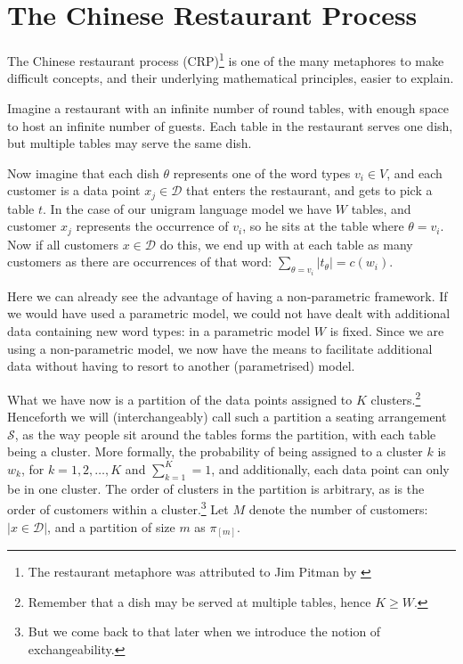 \section{The Chinese Restaurant Process}
The Chinese restaurant process (CRP)\footnote{The restaurant metaphore was attributed to Jim Pitman by \cite{Aldous1985Exchangeability}} is one of the many metaphores to make difficult concepts, and their underlying mathematical principles, easier to explain. 

Imagine a restaurant with an infinite number of round tables, with enough space to host an infinite number of guests. Each table in the restaurant serves one dish, but multiple tables may serve the same dish.

Now imagine that each dish $\theta$ represents one of the word types $v_i \in V$, and each customer is a data point $x_j\in\mathcal{D}$ that enters the restaurant, and gets to pick a table $t$. In the case of our unigram language model we have $W$ tables, and customer $x_j$ represents the occurrence of $v_i$, so he sits at the table where $\theta = 
v_i$. Now if all customers $x\in\mathcal{D}$ do this, we end up with at each table as many customers as there are occurrences of that word: $\sum_{\theta=v_i}|t_{\theta}| = c(w_i)$.

Here we can already see the advantage of having a non-parametric framework. If we would have used a parametric model, we could not have dealt with additional data containing new word types: in a parametric model $W$ is fixed. Since we are using a non-parametric model, we now have the means to facilitate additional data without having to resort to another (parametrised) model.

What we have now is a partition of the data points assigned to $K$ clusters.\footnote{Remember that a dish may be served at multiple tables, hence $K\geq W$.} Henceforth we will (interchangeably) call such a partition a seating arrangement $\mathcal{S}$, as the way people sit around the tables forms the partition, with each table being a cluster. More formally, the probability of being assigned to a cluster $k$ is $w_k$, for $k = 1, 2, \ldots, K$ and $\sum_{k=1}^K = 1$, and additionally, each data point can only be in one cluster. The order of clusters in the partition is arbitrary, as is the order of customers within a cluster.\footnote{But we come back to that later when we introduce the notion of exchangeability.} Let $M$ denote the number of customers: $|x\in\mathcal{D}|$, and a partition of size $m$ as $\pi_{[m]}$. 

